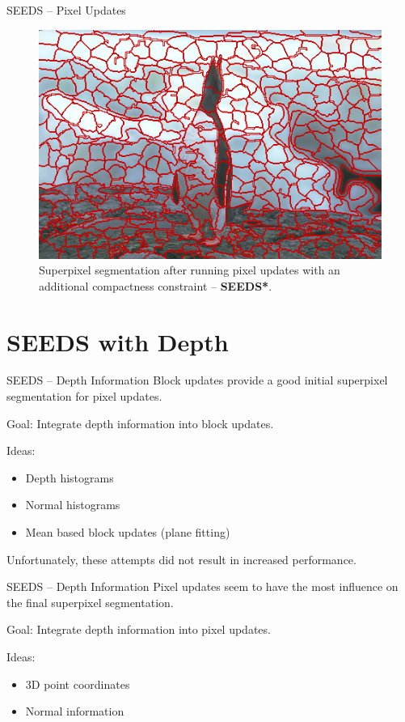 \documentclass[handout]{beamer}
\begin{document}
	\begin{frame}{SEEDS -- Pixel Updates}
		\begin{figure}
   			\centering
   			\includegraphics[scale=0.5]{images/bsd-2-reseedssm-400}
   			\caption{Superpixel segmentation after running pixel updates with an additional compactness constraint -- \textbf{SEEDS*}.}
   		\end{figure}
	\end{frame}

	\section{SEEDS with Depth}
	\begin{frame}{SEEDS -- Depth Information}
		Block updates provide a good initial superpixel segmentation for pixel updates.
		\vskip 0.5cm
	
		Goal: Integrate depth information into block updates.
		\vskip 0.25cm
		
		Ideas:
		\vskip 0.25cm
		\begin{itemize}[label=--]
			\item Depth histograms
			\item Normal histograms
			\item Mean based block updates (plane fitting)
		\end{itemize}
		\vskip 0.25cm
		\pause
		
		Unfortunately, these attempts did not result in increased performance.
		\vskip 0.25cm
	\end{frame}
	
	\begin{frame}{SEEDS -- Depth Information}
		Pixel updates seem to have the most influence on the final superpixel segmentation.
		\vskip 0.5cm
	
		Goal: Integrate depth information into pixel updates.
		\vskip 0.25cm
		
		Ideas:
		\vskip 0.25cm
		\begin{itemize}[label=--]
			\item 3D point coordinates
			\item Normal information
		\end{itemize}
		\vskip 0.5cm
	\end{frame}
	
\end{document}

